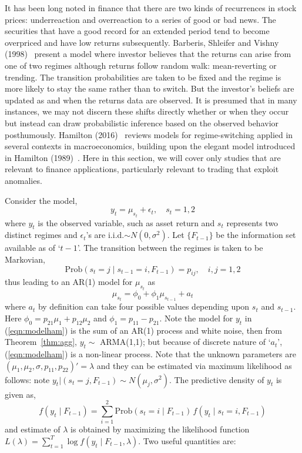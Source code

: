 It has been long noted in finance that there are two kinds of recurrences in stock prices: underreaction and overreaction to a series of good or bad news. The securities that have a good record for an extended period tend to become overpriced and have low returns subsequently. Barberis, Shleifer and Vishny (1998)~\cite{vishny} present a model where investor believes that the returns can arise from one of two regimes although returns follow random walk: mean-reverting or trending. The transition probabilities are taken to be fixed and the regime is more likely to stay the same rather than to switch. But the investor's beliefs are updated as and when the returns data are observed. It is presumed that in many instances, we may not discern these shifts directly whether or when they occur but instead can draw probabilistic inference based on the observed behavior posthumously. Hamilton (2016)~\cite{jdham} reviews models for regime-switching applied in several contexts in macroeconomics, building upon the elegant model introduced in Hamilton (1989)~\cite{89ham}. Here in this section, we will cover only studies that are relevant to finance applications, particularly relevant to trading that exploit anomalies. 


Consider the model,
	\begin{equation}\label{eqn:modelham}
	y_t = \mu_{s_t} + \epsilon_t, \quad s_t=1,2
	\end{equation} 
where $y_t$ is the observed variable, such as asset return and $s_t$ represents two distinct regimes and $\epsilon_t$'s are i.i.d.$\sim N(0,\sigma^2)$. Let $\{F_{t-1}\}$ be the information set available as of `$t-1$'. The transition between the regimes is taken to be Markovian,
	\begin{equation}\label{eqn:markprob}
	\text{Prob}(s_t=j \;|\; s_{t-1}=i, F_{t-1})= p_{ij}, \quad i,j=1,2
	\end{equation}
thus leading to an AR(1) model for $\mu_{s_t}$ as
	\begin{equation}\label{eqn:must}
	\mu_{s_t} = \phi_0 + \phi_1 \mu_{s_{t-1}} + a_t
	\end{equation}
where $a_t$ by definition can take four possible values depending upon $s_t$ and $s_{t-1}$. Here $\phi_0=p_{21}\mu_1 + p_{12} \mu_2$ and $\phi_1=p_{11}-p_{21}$. Note the model for $y_t$ in (\ref{eqn:modelham}) is the sum of an AR(1) process and white noise, then from Theorem~\ref{thm:agg}, $y_t \sim$ ARMA(1,1); but because of discrete nature of `$a_t$', (\ref{eqn:modelham}) is a non-linear process. Note that the unknown parameters are $(\mu_1,\mu_2,\sigma,p_{11},p_{22})'=\lambda$ and they can be estimated via maximum likelihood as follows: note $y_t|(s_t=j,F_{t-1})\sim N(\mu_j,\sigma^2)$. The predictive density of $y_t$ is given as,
	\begin{equation}\label{eqn:predden}
	f(y_t \;|\; F_{t-1})= \sum_{i=1}^2 \text{Prob}(s_t=i \;|\; F_{t-1}) \, f(y_t \;|\; s_t=i, F_{t-1})
	\end{equation}
and estimate of $\lambda$ is obtained by maximizing the likelihood function $L(\lambda)=\sum_{t=1}^T \log f(y_t \;|\; F_{t-1}, \lambda)$. Two useful quantities are: \\


